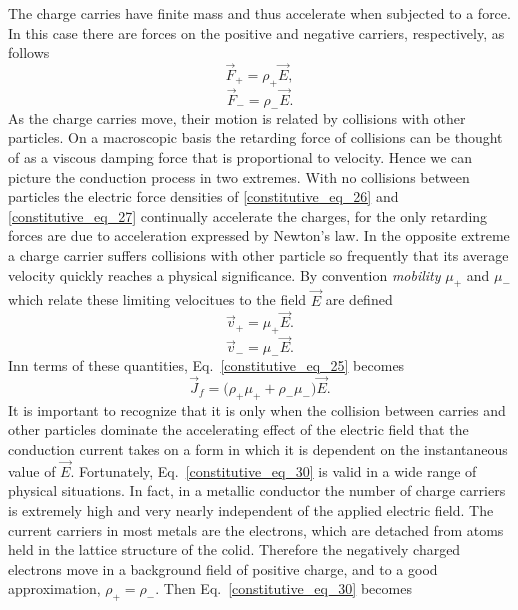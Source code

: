 \documentclass[11pt,a4paper,oneside]{book}
\numberwithin{equation}{section}
\theoremstyle{it}
\theoremstyle{definition}
\begin{document}
The charge carries have finite mass and thus accelerate when subjected to a force. In this case there are forces on the positive and negative carriers, respectively, as follows
\begin{equation}\label{constitutive_eq_26}
	\vec{F}_{+}=\rho_{+}\vec{E},
\end{equation}
\begin{equation}\label{constitutive_eq_27}
	\vec{F}_{-}=\rho_{-}\vec{E}.
\end{equation}
As the charge carries move, their motion is related by collisions with other particles. On a macroscopic basis the retarding force of collisions can be thought of as a viscous damping force that is proportional to velocity. Hence we can picture the conduction process in two extremes. With no collisions between particles the electric force densities of \ref{constitutive_eq_26} and \ref{constitutive_eq_27} continually accelerate the charges, for the only retarding forces are due to acceleration expressed by Newton's law. In the opposite extreme a charge carrier suffers collisions with other particle so frequently that its average velocity quickly reaches a physical significance. By convention \textit{mobility} $\mu_{+}$ and $\mu_{-}$ which relate these limiting velocitues to the field $\vec{E}$ are defined
\begin{equation}\label{constitutive_eq_28}
	\vec{v}_{+}=\mu_{+}\vec{E}.
\end{equation}
\begin{equation}\label{constitutive_eq_29}
	\vec{v}_{-}=\mu_{-}\vec{E}.
\end{equation}
Inn terms of these quantities, Eq.~\eqref{constitutive_eq_25} becomes
\begin{equation}\label{constitutive_eq_30}
	\vec{J}_{f}=\big(\rho_{+}\mu_{+}+\rho_{-}\mu_{-}\big)\vec{E}.
\end{equation}
It is important to recognize that it is only when the collision between carries and other particles dominate the accelerating effect of the electric field that the conduction current takes on a form in which it is dependent on the instantaneous value of $\vec{E}$. Fortunately, Eq.~\eqref{constitutive_eq_30} is valid in a wide range of physical situations. In fact, in a metallic conductor the number of charge carriers is extremely high and very nearly independent of the applied electric field. The current carriers in most metals are the electrons, which are detached from atoms held in the lattice structure of the colid. Therefore the negatively charged electrons move in a background field of positive charge, and to a good approximation, $\rho_{+}=\rho_{-}$. Then Eq.~\eqref{constitutive_eq_30} becomes
\end{document}

